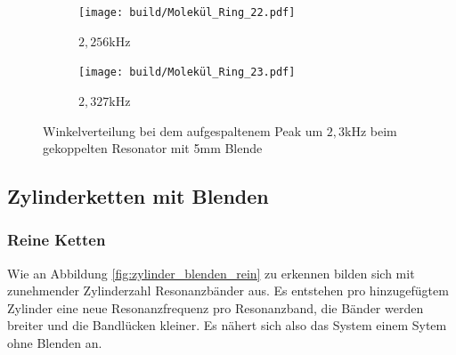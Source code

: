 \begin{figure}
  \centering
  \begin{subfigure}{0.4\textwidth}
    \centering
    \texttt{[image: build/Molekül\_Ring\_22.pdf]}
    \caption{$2,256$kHz}
  \end{subfigure}
  \begin{subfigure}{0.4\textwidth}
    \centering
    \texttt{[image: build/Molekül\_Ring\_23.pdf]}
    \caption{$2,327$kHz}
  \end{subfigure}
  \caption{Winkelverteilung bei dem aufgespaltenem Peak um $2,3$kHz beim gekoppelten Resonator mit 5mm Blende}
  \label{fig:molekül_plots_}
\end{figure}

\subsection{Zylinderketten mit Blenden}
\subsubsection{Reine Ketten}
Wie an Abbildung \ref{fig:zylinder_blenden_rein} zu erkennen bilden sich mit zunehmender Zylinderzahl Resonanzbänder aus.
Es entstehen pro hinzugefügtem Zylinder eine neue Resonanzfrequenz pro Resonanzband, die Bänder werden breiter und die Bandlücken kleiner.
Es nähert sich also das System einem Sytem ohne Blenden an.

